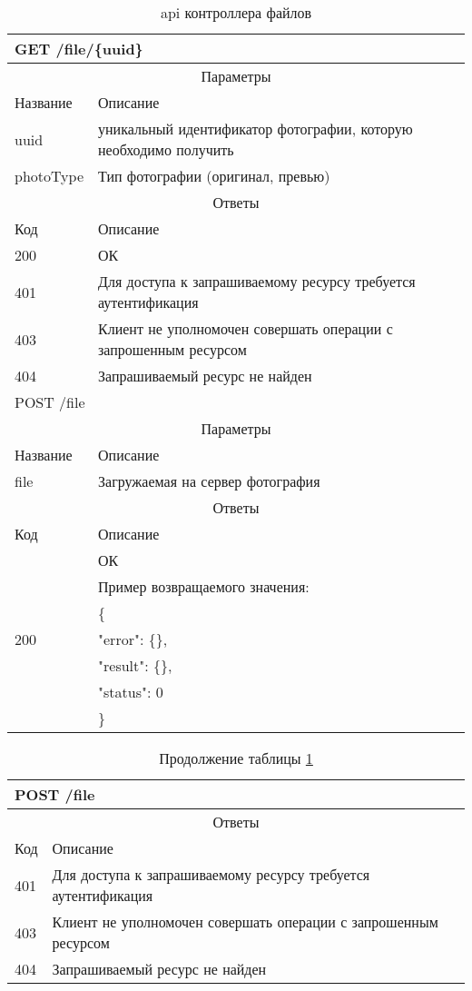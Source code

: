\begin{table}[H]
  \caption{api контроллера файлов}\label{api-files-table}
  \begin{tabular}{|p{6cm}|p{10cm}|}
  \hline \multicolumn{2}{|l|}{GET /file/\{uuid\}} \\
  \hline \multicolumn{2}{|c|}{Параметры} \\
  \hline Название & Описание \\
  \hline uuid & уникальный идентификатор фотографии, которую необходимо получить \\
  \hline photoType & Тип фотографии (оригинал, превью) \\
  \hline \multicolumn{2}{|c|}{Ответы} \\
  \hline Код & Описание \\
  \hline \multirow{1}{=}{200} & ОК \\
  \hline 401 & Для доступа к запрашиваемому ресурсу требуется аутентификация \\
  \hline 403 & Клиент не уполномочен совершать операции с запрошенным ресурсом \\
  \hline 404 & Запрашиваемый ресурс не найден \\
  \hline \multicolumn{2}{|l|}{POST /file} \\
  \hline \multicolumn{2}{|c|}{Параметры} \\
  \hline Название & Описание \\
  \hline file & Загружаемая на сервер фотография \\
  \hline \multicolumn{2}{|c|}{Ответы} \\
  \hline Код & Описание \\
  \hline \multirow{7}{=}{200} & ОК \\
   & Пример возвращаемого значения: \\
   & \{ \\
   & "error": \{\}, \\
   & "result": \{\}, \\
   & "status": 0 \\
   & \} \\
  \hline
  \end{tabular}
\end{table}
\begin{table}[H]
  \caption*{Продолжение таблицы \ref{api-files-table}}
  \begin{tabular}{|p{6cm}|p{10cm}|}
  \hline \multicolumn{2}{|l|}{POST /file} \\
  \hline \multicolumn{2}{|c|}{Ответы} \\
  \hline Код & Описание \\
  \hline 401 & Для доступа к запрашиваемому ресурсу требуется аутентификация \\
  \hline 403 & Клиент не уполномочен совершать операции с запрошенным ресурсом \\
  \hline 404 & Запрашиваемый ресурс не найден \\
  \hline
  \end{tabular}
\end{table}

